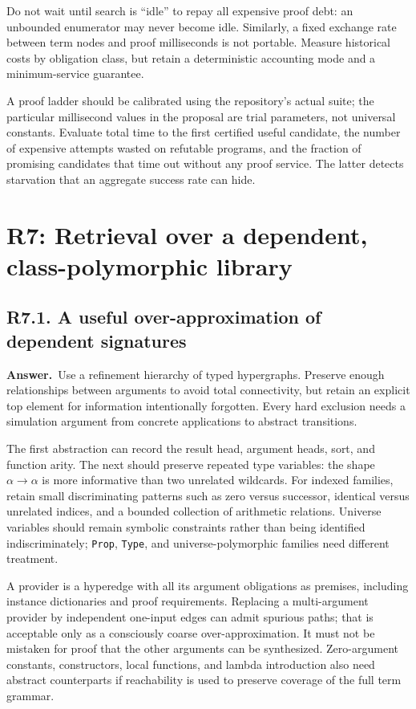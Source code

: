 \documentclass[11pt,a4paper]{article}
\newcommand{\code}[1]{\nolinkurl{#1}}
\newcommand{\qid}[3]{\subsection{#2. #3}\label{#1}}
\newcommand{\answer}{\noindent\textbf{Answer.}\ }
\theoremstyle{remark}
\begin{document}
Do not wait until search is ``idle'' to repay all expensive proof debt: an unbounded enumerator may never become idle. Similarly, a fixed exchange rate between term nodes and proof milliseconds is not portable. Measure historical costs by obligation class, but retain a deterministic accounting mode and a minimum-service guarantee.

A proof ladder should be calibrated using the repository's actual suite; the particular millisecond values in the proposal are trial parameters, not universal constants. Evaluate total time to the first certified useful candidate, the number of expensive attempts wasted on refutable programs, and the fraction of promising candidates that time out without any proof service. The latter detects starvation that an aggregate success rate can hide.

\section{R7: Retrieval over a dependent, class-polymorphic library}\label{sec:r7}

\qid{q71}{R7.1}{A useful over-approximation of dependent signatures}
\answer Use a refinement hierarchy of typed hypergraphs. Preserve enough relationships between arguments to avoid total connectivity, but retain an explicit top element for information intentionally forgotten. Every hard exclusion needs a simulation argument from concrete applications to abstract transitions.

The first abstraction can record the result head, argument heads, sort, and function arity. The next should preserve repeated type variables: the shape $\alpha\to\alpha$ is more informative than two unrelated wildcards. For indexed families, retain small discriminating patterns such as zero versus successor, identical versus unrelated indices, and a bounded collection of arithmetic relations. Universe variables should remain symbolic constraints rather than being identified indiscriminately; \code{Prop}, \code{Type}, and universe-polymorphic families need different treatment.

A provider is a hyperedge with all its argument obligations as premises, including instance dictionaries and proof requirements. Replacing a multi-argument provider by independent one-input edges can admit spurious paths; that is acceptable only as a consciously coarse over-approximation. It must not be mistaken for proof that the other arguments can be synthesized. Zero-argument constants, constructors, local functions, and lambda introduction also need abstract counterparts if reachability is used to preserve coverage of the full term grammar.
\end{document}
